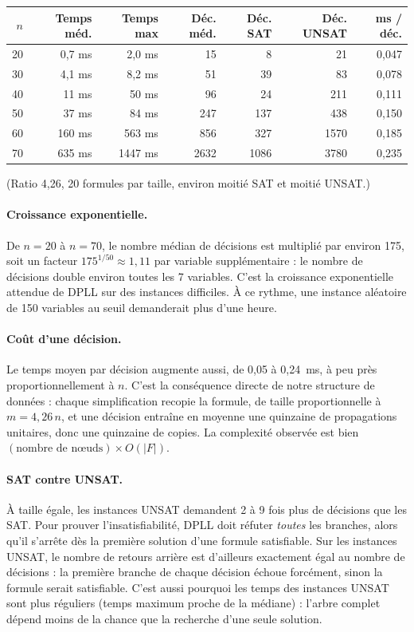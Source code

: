 \documentclass[11pt,a4paper]{article}
\begin{document}
\begin{center}
\begin{tabular}{rrrrrrr}
  $n$ & Temps méd. & Temps max & Déc. méd. & Déc. SAT & Déc. UNSAT & ms / déc. \\
  \hline
  20 & 0,7 ms  & 2,0 ms  & 15   & 8    & 21   & 0,047 \\
  30 & 4,1 ms  & 8,2 ms  & 51   & 39   & 83   & 0,078 \\
  40 & 11 ms   & 50 ms   & 96   & 24   & 211  & 0,111 \\
  50 & 37 ms   & 84 ms   & 247  & 137  & 438  & 0,150 \\
  60 & 160 ms  & 563 ms  & 856  & 327  & 1570 & 0,185 \\
  70 & 635 ms  & 1447 ms & 2632 & 1086 & 3780 & 0,235 \\
\end{tabular}
\end{center}
\noindent(Ratio 4,26, 20 formules par taille, environ moitié SAT et moitié
UNSAT.)

\paragraph{Croissance exponentielle.} De $n=20$ à $n=70$, le nombre médian de
décisions est multiplié par environ 175, soit un facteur
$175^{1/50}\approx 1{,}11$ par variable supplémentaire : le nombre de
décisions double environ toutes les 7 variables. C'est la croissance exponentielle attendue
de DPLL sur des instances difficiles. À ce rythme, une instance aléatoire
de 150 variables au seuil demanderait plus d'une heure.

\paragraph{Coût d'une décision.} Le temps moyen par décision augmente aussi,
de 0,05 à 0,24~ms, à peu près proportionnellement à $n$. C'est la
conséquence directe de notre structure de données : chaque simplification
recopie la formule, de taille proportionnelle à $m = 4{,}26\,n$, et une
décision entraîne en moyenne une quinzaine de propagations unitaires, donc
une quinzaine de copies. La complexité observée est bien
$(\text{nombre de n\oe{}uds}) \times O(|F|)$.

\paragraph{SAT contre UNSAT.} À taille égale, les instances UNSAT demandent
2 à 9 fois plus de décisions que les SAT. Pour prouver l'insatisfiabilité,
DPLL doit réfuter \emph{toutes} les branches, alors qu'il s'arrête dès la
première solution d'une formule satisfiable. Sur les instances UNSAT, le
nombre de retours arrière est d'ailleurs exactement égal au nombre de
décisions : la première branche de chaque décision échoue forcément, sinon
la formule serait satisfiable. C'est aussi pourquoi les temps des instances
UNSAT sont plus réguliers (temps maximum proche de la médiane) : l'arbre
complet dépend moins de la chance que la recherche d'une seule solution.
\end{document}
